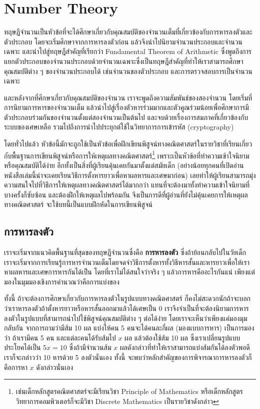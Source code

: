 \chapter{Number Theory}
\theopart
ทฤษฎีจำนวนเป็นหัวข้อที่จะได้ศึกษาเกี่ยวกับคุณสมบัติของจำนวนเต็มที่เกี่ยวข้องกับการหารลงตัวและตัวประกอบ โดยจะเริ่มศึกษาจากการหารลงตัวก่อน แล้วจึงนำไปนิยามจำนวนประกอบและจำนวนเฉพาะ และนำไปสู่ทฤษฎีสำคัญที่เรียกว่า Fundamental Theorem of Arithmetic ซึ่งพูดถึงการแยกตัวประกอบของจำนวนประกอบด้วยจำนวนเฉพาะซึ่งเป็นทฤษฎีสำคัญที่ทำให้เราสามารถศึกษาคุณสมบัติต่าง ๆ ของจำนวนประกอบได้ เช่นจำนวนของตัวประกอบ และการตรวจสอบการเป็นจำนวนเฉพาะ

และหลังจากที่ศึกษาเกี่ยวกับคุณสมบัติของจำนวน เราจะพูดถึงความสัมพันธ์ของสองจำนวน โดยเริ่มที่การนิยามการหารของจำนวนเต็ม แล้วนำไปสู่เรื่องตัวหารร่วมมากและตัวคูณร่วมน้อยเพื่อศึกษาการมีตัวประกอบร่วมกันของจำนวนตั้งแต่สองจำนวนเป็นต้นไป และจบด้วยเรื่องการสมภาคที่เกี่ยวข้องกับระบบของเศษเหลือ รวมไปถึงการนำไปประยุกต์ใช้ในวิทยาการการเข้ารหัส (cryptography)

โดยทั่วไปแล้ว หัวข้อนี้มักจะถูกใช้เป็นหัวข้อเพื่อฝึกเขียนพิสูจน์ทางคณิตศาสตร์ในรายวิชาที่เรียนเกี่ยวกับพื้นฐานการเขียนพิสูจน์หรือการให้เหตุผลทางคณิตศาสตร์\footnote{เช่นเด็กหลักสูตรคณิตศาสตร์จะมีเรียนวิชา Principle of Mathematics หรือเด็กหลักสูตรวิทยาการคอมพิวเตอร์ก็จะมีวิชา Discrete Mathematics เป็นรายวิชาดังกล่าว} เพราะเป็นหัวข้อที่ทำความเข้าใจนิยามหรือคุณสมบัติได้ง่าย อีกทั้งเป็นสิ่งที่ผู้เรียนคุ้นเคยกันมาตั้งแต่สมัยเด็ก (อย่างน้อยทุกคนที่เปิดอ่านหนังสือเล่มนี้น่าจะเคยเรียนวิธีการตั้งหารยาวเพื่อหาผลหารและเศษมาก่อน)
เลยทำให้ผู้เรียนสามารถมุ่งความสนใจไปที่วิธีการให้เหตุผลทางคณิตศาสตร์ได้มากกว่า แทนที่จะต้องมาทั้งทำความเข้าใจนิยามที่บางครั้งก็ซับซ้อน และต้องฝึกให้เหตุผลไปพร้อมกัน จึงเป็นการดีที่ผู้อ่านที่ยังไม่คุ้นเคยการให้เหตุผลทางคณิตศาสตร์ จะใช้บทนี้เป็นแบบฝึกหัดในการเขียนพิสูจน์

\section{การหารลงตัว}
เราจะเริ่มจากแนวคิดพื้นฐานที่สุดของทฤษฎีจำนวนซึ่งคือ \textbf{การหารลงตัว} ซึ่งถ้าย้อนกลับไปในวัยเด็ก เราจะเริ่มจากการเรียนรู้การหารจำนวนเต็มโดยจดจำวิธีการตั้งหารทั้งวิธีหารสั้นและหารยาวเพื่อให้เราหาผลหารและเศษการหารกันได้เป็น โดยที่เราไม่ได้สนใจว่าจริง ๆ แล้วการหารคืออะไรกันแน่ เพียงแต่มองในมุมมองเชิงการคำนวณว่าคือการแบ่งของ

ทั้งนี้ ถ้าจะต้องการศึกษาเกี่ยวกับการหารลงตัวในรูปแบบทางคณิตศาสตร์ ก็คงไม่สะดวกนักถ้าจะบอกว่าเราหารลงตัวถ้าตั้งหารยาวหรือหารสั้นออกมาแล้วได้เศษเป็น 0 เราจึงจำเป็นที่จะต้องนิยามการหารลงตัวในรูปแบบที่สามารถนำไปใช้พิสูจน์คุณสมบัติต่าง ๆ ต่อได้ง่าย โดยเราจะเห็นว่าเพียงแค่มองมุมกลับกัน จากการถามว่ามีส้ม 10 ผล แบ่งให้คน 5 คนจะได้คนละกี่ผล (มองแบบการหาร) เป็นการมองว่า ถ้าเรามีคน 5 คน และแต่ละคนได้รับส้มไป $x$ ผล แล้วต้องใช้ส้ม 10 ผล ซึ่งเราเปลี่ยนรูปแบบประโยคได้เป็น $5x = 10$ ซึ่งถ้ามีจำนวนส้ม $x$ ผลดังกล่าวที่ทำให้เราสามารถแบ่งส้มกันได้ลงตัวพอดี เราก็จะกล่าวว่า 10 หารด้วย 5 ลงตัวนั่นเอง ทั้งนี้ จะพบว่าหลักสำคัญของการพิจารณาการหารลงตัวก็คือการหา $x$ ดังกล่าวนั่นเอง

